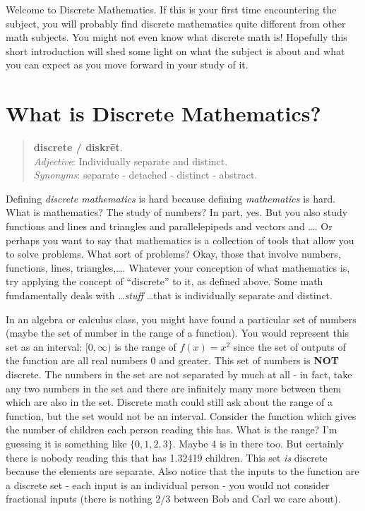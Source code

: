 \documentclass[12pt]{article}
\begin{document}
Welcome to Discrete Mathematics.  If this is your first time encountering the subject, you will probably find discrete mathematics quite different from other math subjects.  You might not even know what discrete math is!  Hopefully this short introduction will shed some light on what the subject is about and what you can expect as you move forward in your study of it.

\section{What is Discrete Mathematics?}

\begin{quotation}
\noindent \textbf{dis\textperiodcentered crete / dis\textquotesingle kr\={e}t}. \\ {\em Adjective}: Individually separate and distinct.  \\{\em Synonyms}: separate - detached - distinct - abstract.
\end{quotation}

Defining {\em discrete mathematics} is hard because defining {\em mathematics} is hard.  What is mathematics?  The study of numbers?  In part, yes.  But you also study functions and lines and triangles and parallelepipeds and vectors and \ldots.  Or perhaps you want to say that mathematics is a collection of tools that allow you to solve problems.  What sort of problems?  Okay, those that involve numbers, functions, lines, triangles,\ldots.  Whatever your conception of what mathematics is, try applying the concept of ``discrete'' to it, as defined above.  Some math fundamentally deals with \ldots {\em stuff} \ldots that is individually separate and distinct.  

In an algebra or calculus class, you might have found a particular set of numbers (maybe the set of number in the range of a function).  You would represent this set as an interval: $[0,\infty)$ is the range of $f(x) = x^2$ since the set of outputs of the function are all real numbers 0 and greater.  This set of numbers is \textbf{NOT} discrete.  The numbers in the set are not separated by much at all - in fact, take any two numbers in the set and there are infinitely many more between them which are also in the set.  Discrete math could still ask about the range of a function, but the set would not be an interval.  Consider the function which gives the number of children each person reading this has.  What is the range?  I'm guessing it is something like $\{0, 1, 2, 3\}$.  Maybe 4 is in there too.  But certainly there is nobody reading this that has 1.32419 children.  This set {\em is} discrete because the elements are separate.  Also notice that the inputs to the function are a discrete set - each input is an individual person - you would not consider fractional inputs (there is nothing $2/3$ between Bob and Carl we care about).  
\end{document}
